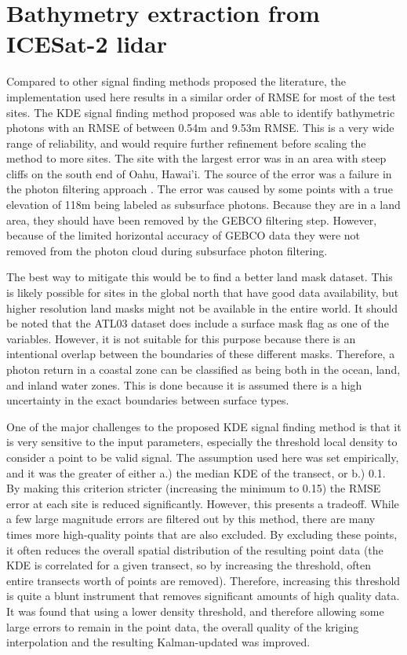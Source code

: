 \section{Bathymetry extraction from ICESat-2 lidar}

Compared to other signal finding methods proposed the literature, the implementation used here results in a similar order of RMSE for most of the test sites. The KDE signal finding method proposed was able to identify bathymetric photons with an RMSE of between 0.54m and 9.53m RMSE. This is a very wide range of reliability, and would require further refinement before scaling the method to more sites. The site with the largest error was in an area with steep cliffs on the south end of Oahu, Hawai'i. The source of the error was a failure in the photon filtering approach . The error was caused by some points with a true elevation of 118m being labeled as subsurface photons. Because they are in a land area, they should have been removed by the GEBCO filtering step. However, because of the limited horizontal accuracy of GEBCO data they were not removed from the photon cloud during subsurface photon filtering.

The best way to mitigate this would be to find a better land mask dataset. This is likely possible for sites in the global north that have good data availability, but higher resolution land masks might not be available in the entire world. It should be noted that the ATL03 dataset does include a surface mask flag as one of the variables. However, it is not suitable for this purpose because there is an intentional overlap between the boundaries of these different masks. Therefore, a photon return in a coastal zone can be classified as being both in the ocean, land, and inland water zones. This is done because it is assumed there is a high uncertainty in the exact boundaries between surface types. 

One of the major challenges to the proposed KDE signal finding method is that it is very sensitive to the input parameters, especially the threshold local density to consider a point to be valid signal. The assumption used here was set empirically, and it was the greater of either a.) the median KDE of the transect, or b.) 0.1. By making this criterion stricter (increasing the minimum to 0.15) the RMSE error at each site is reduced significantly. However, this presents a tradeoff. While a few large magnitude errors are filtered out by this method, there are many times more high-quality points that are also excluded. By excluding these points, it often reduces the overall spatial distribution of the resulting point data (the KDE is correlated for a given transect, so by increasing the threshold, often entire transects worth of points are removed). Therefore, increasing this threshold is quite a blunt instrument that removes significant amounts of high quality data. It was found that using a lower density threshold, and therefore allowing some large errors to remain in the point data, the overall quality of the kriging interpolation and the resulting Kalman-updated was improved. 

